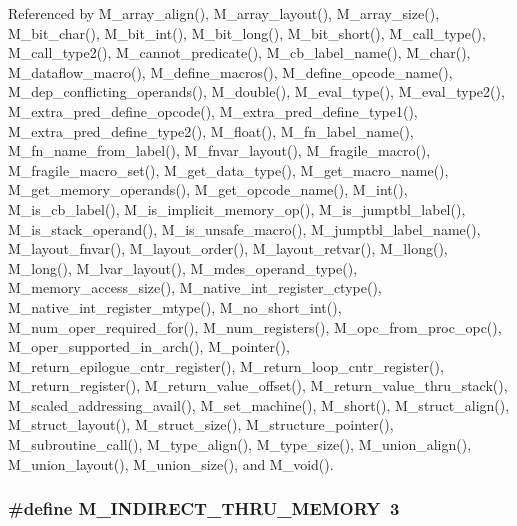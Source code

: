 Referenced by M\_\-array\_\-align(), M\_\-array\_\-layout(), M\_\-array\_\-size(), M\_\-bit\_\-char(), M\_\-bit\_\-int(), M\_\-bit\_\-long(), M\_\-bit\_\-short(), M\_\-call\_\-type(), M\_\-call\_\-type2(), M\_\-cannot\_\-predicate(), M\_\-cb\_\-label\_\-name(), M\_\-char(), M\_\-dataflow\_\-macro(), M\_\-define\_\-macros(), M\_\-define\_\-opcode\_\-name(), M\_\-dep\_\-conflicting\_\-operands(), M\_\-double(), M\_\-eval\_\-type(), M\_\-eval\_\-type2(), M\_\-extra\_\-pred\_\-define\_\-opcode(), M\_\-extra\_\-pred\_\-define\_\-type1(), M\_\-extra\_\-pred\_\-define\_\-type2(), M\_\-float(), M\_\-fn\_\-label\_\-name(), M\_\-fn\_\-name\_\-from\_\-label(), M\_\-fnvar\_\-layout(), M\_\-fragile\_\-macro(), M\_\-fragile\_\-macro\_\-set(), M\_\-get\_\-data\_\-type(), M\_\-get\_\-macro\_\-name(), M\_\-get\_\-memory\_\-operands(), M\_\-get\_\-opcode\_\-name(), M\_\-int(), M\_\-is\_\-cb\_\-label(), M\_\-is\_\-implicit\_\-memory\_\-op(), M\_\-is\_\-jumptbl\_\-label(), M\_\-is\_\-stack\_\-operand(), M\_\-is\_\-unsafe\_\-macro(), M\_\-jumptbl\_\-label\_\-name(), M\_\-layout\_\-fnvar(), M\_\-layout\_\-order(), M\_\-layout\_\-retvar(), M\_\-llong(), M\_\-long(), M\_\-lvar\_\-layout(), M\_\-mdes\_\-operand\_\-type(), M\_\-memory\_\-access\_\-size(), M\_\-native\_\-int\_\-register\_\-ctype(), M\_\-native\_\-int\_\-register\_\-mtype(), M\_\-no\_\-short\_\-int(), M\_\-num\_\-oper\_\-required\_\-for(), M\_\-num\_\-registers(), M\_\-opc\_\-from\_\-proc\_\-opc(), M\_\-oper\_\-supported\_\-in\_\-arch(), M\_\-pointer(), M\_\-return\_\-epilogue\_\-cntr\_\-register(), M\_\-return\_\-loop\_\-cntr\_\-register(), M\_\-return\_\-register(), M\_\-return\_\-value\_\-offset(), M\_\-return\_\-value\_\-thru\_\-stack(), M\_\-scaled\_\-addressing\_\-avail(), M\_\-set\_\-machine(), M\_\-short(), M\_\-struct\_\-align(), M\_\-struct\_\-layout(), M\_\-struct\_\-size(), M\_\-structure\_\-pointer(), M\_\-subroutine\_\-call(), M\_\-type\_\-align(), M\_\-type\_\-size(), M\_\-union\_\-align(), M\_\-union\_\-layout(), M\_\-union\_\-size(), and M\_\-void().
\subsubsection{\setlength{\rightskip}{0pt plus 5cm}\#define M\_\-INDIRECT\_\-THRU\_\-MEMORY~3}\label{m__spec_8h_083e3f5a5c0f530be89e464803ad2599}




